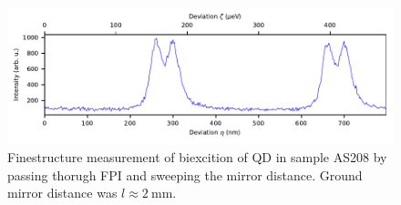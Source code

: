 \begin{figure}[H]
	\centering
	\includegraphics[width=1\linewidth]{figures/fabry-perot/plots/measurement-fabry-perot-dot-biexciton-FSS}
	\caption{Finestructure measurement of biexcition of QD in sample AS208 by passing thorugh FPI and sweeping the mirror distance.
	Ground mirror distance was  $l \approx \SI{2}{\milli \meter}$.}
	\label{fig:measurement-fabry-perot-dot-biexciton-fss}
\end{figure}




